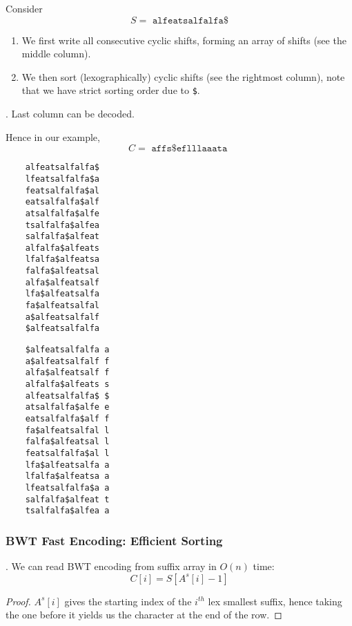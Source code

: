 \documentclass{article}
\begin{document}
\begin{minipage}{0.5\textwidth}
    Consider 
    \[ S = \texttt{ alfeatsalfalfa\$ } \] 
    \begin{enumerate}
        \item We first write all consecutive cyclic shifts, forming an array of shifts (see the middle column). 
        \item We then sort (lexographically) cyclic shifts (see the rightmost column), note that we have strict sorting order due to \texttt{\$}. 
    \end{enumerate}
    \begin{result}[].
        Last column can be decoded. 
    \end{result}
    Hence in our example, 
    \[ C = \texttt{ affs\$eflllaaata } \]
\end{minipage} \begin{minipage}{0.25\textwidth}
    \begin{verbatim}
    alfeatsalfalfa$
    lfeatsalfalfa$a
    featsalfalfa$al
    eatsalfalfa$alf
    atsalfalfa$alfe
    tsalfalfa$alfea
    salfalfa$alfeat
    alfalfa$alfeats
    lfalfa$alfeatsa
    falfa$alfeatsal
    alfa$alfeatsalf
    lfa$alfeatsalfa
    fa$alfeatsalfal
    a$alfeatsalfalf
    $alfeatsalfalfa
    \end{verbatim}
\end{minipage} \begin{minipage}{0.3\textwidth}
    \begin{verbatim}
    $alfeatsalfalfa a
    a$alfeatsalfalf f
    alfa$alfeatsalf f
    alfalfa$alfeats s
    alfeatsalfalfa$ $
    atsalfalfa$alfe e
    eatsalfalfa$alf f
    fa$alfeatsalfal l
    falfa$alfeatsal l
    featsalfalfa$al l
    lfa$alfeatsalfa a
    lfalfa$alfeatsa a
    lfeatsalfalfa$a a
    salfalfa$alfeat t
    tsalfalfa$alfea a
    \end{verbatim}
\end{minipage}

\subsubsection{BWT Fast Encoding: Efficient Sorting}

\begin{thmm}[].
    We can read BWT encoding from suffix array in $O(n)$ time: 
    \[ C[i] = S[ A^s[i] - 1 ] \]
\end{thmm}

\begin{proof}
    $A^s[i]$ gives the starting index of the $i^{th}$ lex smallest suffix, hence taking the one before it yields us the character at the end of the row. 
\end{proof}
\end{document}
